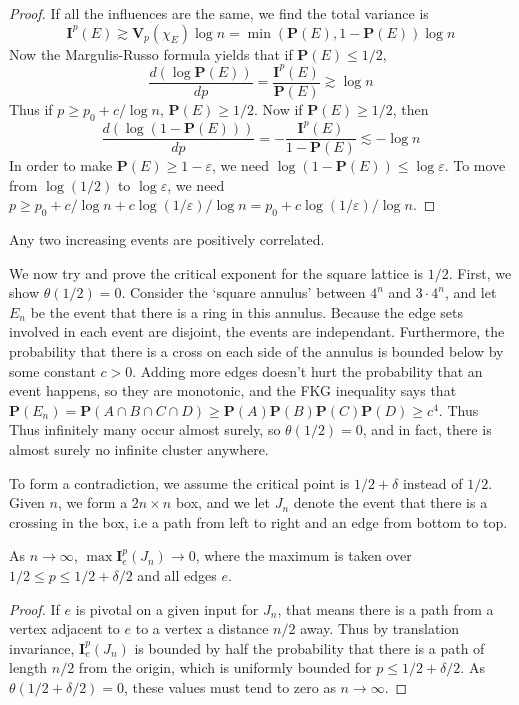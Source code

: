 \begin{proof}
    If all the influences are the same, we find the total variance is
    \[ \mathbf{I}^p(E) \gtrsim \mathbf{V}_p(\chi_E) \log n = \min (\mathbf{P}(E), 1 - \mathbf{P}(E)) \log n \]
    Now the Margulis-Russo formula yields that if $\mathbf{P}(E) \leq 1/2$,
    \[ \frac{d(\log \mathbf{P}(E))}{dp} = \frac{\mathbf{I}^p(E)}{\mathbf{P}(E)} \gtrsim \log n \]
    Thus if $p \geq p_0 + c/\log n$, $\mathbf{P}(E) \geq 1/2$. Now if $\mathbf{P}(E) \geq 1/2$, then
    \[ \frac{d(\log(1 - \mathbf{P}(E)))}{dp} = - \frac{\mathbf{I}^p(E)}{1 - \mathbf{P}(E)} \lesssim - \log n \]
    In order to make $\mathbf{P}(E) \geq 1-\varepsilon$, we need $\log(1 - \mathbf{P}(E)) \leq \log \varepsilon$. To move from $\log(1/2)$ to $\log \varepsilon$, we need $p \geq p_0 + c/\log n + c \log(1/\varepsilon)/\log n = p_0 + c \log(1/\varepsilon)/\log n$.
\end{proof}

\begin{theorem}[FKG]
    Any two increasing events are positively correlated.
\end{theorem}

We now try and prove the critical exponent for the square lattice is $1/2$. First, we show $\theta(1/2) = 0$. Consider the `square annulus' between $4^n$ and $3 \cdot 4^n$, and let $E_n$ be the event that there is a ring in this annulus. Because the edge sets involved in each event are disjoint, the events are independant. Furthermore, the probability that there is a cross on each side of the annulus is bounded below by some constant $c > 0$. Adding more edges doesn't hurt the probability that an event happens, so they are monotonic, and the FKG inequality says that $\mathbf{P}(E_n) = \mathbf{P}(A \cap B \cap C \cap D) \geq \mathbf{P}(A) \mathbf{P}(B) \mathbf{P}(C) \mathbf{P}(D) \geq c^4$. Thus Thus infinitely many occur almost surely, so $\theta(1/2) = 0$, and in fact, there is almost surely no infinite cluster anywhere.

To form a contradiction, we assume the critical point is $1/2 + \delta$ instead of $1/2$. Given $n$, we form a $2n \times n$ box, and we let $J_n$ denote the event that there is a crossing in the box, i.e a path from left to right and an edge from bottom to top.

\begin{lemma}
    As $n \to \infty$, $\max \mathbf{I}_e^{p}(J_n) \to 0$, where the maximum is taken over $1/2 \leq p \leq 1/2 + \delta/2$ and all edges $e$.
\end{lemma}
\begin{proof}
    If $e$ is pivotal on a given input for $J_n$, that means there is a path from a vertex adjacent to $e$ to a vertex a distance $n/2$ away. Thus by translation invariance, $\mathbf{I}_e^p(J_n)$ is bounded by half the probability that there is a path of length $n/2$ from the origin, which is uniformly bounded for $p \leq 1/2 + \delta/2$. As $\theta(1/2 + \delta/2) = 0$, these values must tend to zero as $n \to \infty$.
\end{proof}

